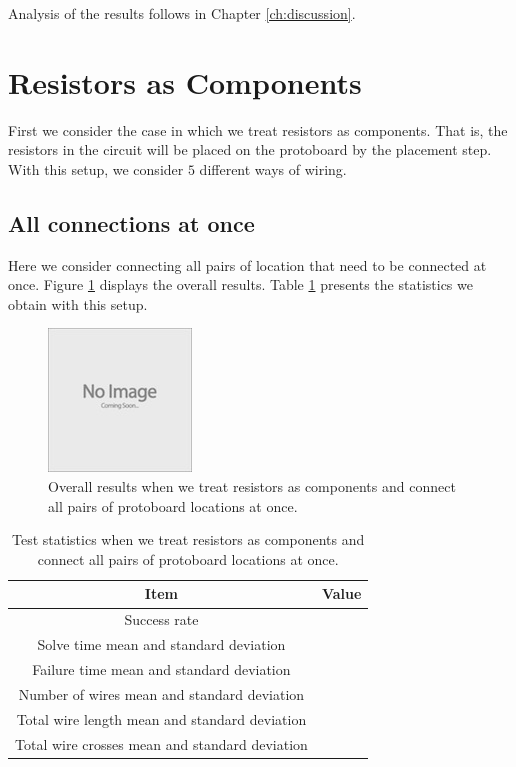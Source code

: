 Analysis of the results follows in Chapter \ref{ch:discussion}.

\section{Resistors as Components}

First we consider the case in which we treat resistors as components. That is,
the resistors in the circuit will be placed on the protoboard by the placement
step. With this setup, we consider $5$ different ways of wiring.

\subsection{All connections at once}

Here we consider connecting all pairs of location that need to
be connected at once. Figure \ref{fig:as_comp_all} displays the overall results.
Table \ref{tb:as_comp_all} presents the statistics we obtain with this setup.

\begin{figure}[H]
\begin{center}
\includegraphics{Images/placeholder.jpg}
\caption{Overall results when we treat resistors as components and connect all
pairs of protoboard locations at once.}
\label{fig:as_comp_all}
\end{center}
\end{figure}

\begin{table}[H]
\begin{center}
\begin{singlespace}
\begin{tabular}{| c | c |}
\hline
Item & Value \\
\hline\hline
Success rate & \\
Solve time mean and standard deviation & \\
Failure time mean and standard deviation & \\
Number of wires mean and standard deviation & \\
Total wire length mean and standard deviation & \\
Total wire crosses mean and standard deviation & \\
\hline
\end{tabular}
\end{singlespace}
\end{center}
\label{tb:as_comp_all}
\caption{Test statistics when we treat resistors as components and connect all
pairs of protoboard locations at once.}
\end{table}

